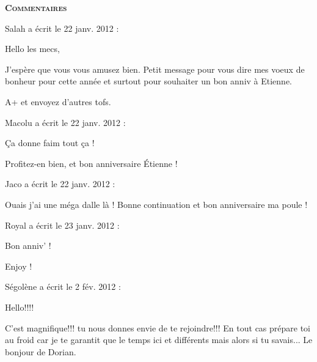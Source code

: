 \bigskip
\textbf{\textsc{Commentaires}}

\medskip
Salah  a écrit le 22 janv. 2012 :
\begin{displayquote}
Hello les mecs,

J'espère que vous vous amusez bien. Petit message pour vous dire mes voeux de bonheur pour cette année et surtout pour souhaiter un bon anniv à Etienne.

A+ et envoyez d'autres tofs.
\end{displayquote}

\medskip
Macolu a écrit le 22 janv. 2012 :
\begin{displayquote}
Ça donne faim tout ça !

Profitez-en bien, et bon anniversaire Étienne !
\end{displayquote}

\medskip
Jaco a écrit le 22 janv. 2012 :
\begin{displayquote}
Ouais j'ai une méga dalle là !
Bonne continuation et bon anniversaire ma poule !
\end{displayquote}

\medskip
Royal a écrit le 23 janv. 2012 :
\begin{displayquote}
Bon anniv' !

Enjoy !
\end{displayquote}

\medskip
Ségolène a écrit le 2 fév. 2012 :
\begin{displayquote}
Hello!!!!

C'est magnifique!!! tu nous donnes envie de te rejoindre!!!
En tout cas prépare toi au froid car je te garantit que le temps ici et différents mais alors si tu savais...
Le bonjour de Dorian.
\end{displayquote}

